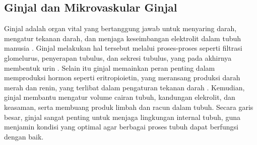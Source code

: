 \subsection{Ginjal dan Mikrovaskular Ginjal}


\noindent Ginjal adalah organ vital yang bertanggung jawab untuk menyaring darah, mengatur tekanan darah, dan menjaga keseimbangan elektrolit dalam tubuh manusia \cite{sultan_microvasculature_2023,ito_s-27-1_2023,bagarao_renal_2023}. %
 Ginjal melakukan hal tersebut melalui proses-proses seperti filtrasi glomelurus, penyerapan tubulus, dan sekresi tubulus, yang pada akhirnya membentuk urin \cite{auctores_publishing_llc_what_2021}. Selain itu ginjal memainkan peran penting dalam memproduksi hormon seperti eritropioietin, yang meransang produksi darah merah dan renin, yang terlibat dalam pengaturan tekanan darah \cite{scannali_s-22-6_2023}. Kemudian, ginjal membantu mengatur volume cairan tubuh, kandungan elekrolit, dan keasaman, serta membuang produk limbah dan racun dalam tubuh. Secara garis besar, ginjal sangat penting untuk menjaga lingkungan internal tubuh, guna menjamin kondisi yang optimal agar berbagai proses tubuh dapat berfungsi dengan baik.
 

